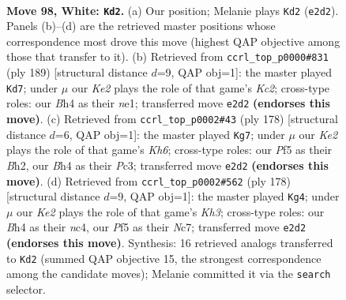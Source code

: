 \documentclass[11pt]{article}
\begin{document}
\clearpage

\begin{figure}[p]\centering
\begin{subfigure}{0.46\textwidth}\centering
\resizebox{\linewidth}{!}{%
\newchessgame
\chessboard[
  setfen={6k1/3n4/8/5P2/p6B/P6P/4K3/8 w - - 15 98},
  showmover=false,
  pgfstyle=straightmove, color=movearrow, markmove={e2-d2}
]}
\caption{}
\end{subfigure}\hfill
\begin{subfigure}{0.46\textwidth}\centering
\resizebox{\linewidth}{!}{%
\newchessgame
\chessboard[
  setfen={8/2k5/8/p7/P7/2K5/4p3/4N3 b - - 57 95},
  showmover=false,
  pgfstyle=straightmove, color=movearrow, markmove={c7-d7}
]}
\caption{}
\end{subfigure}
\\[4pt]
\begin{subfigure}{0.46\textwidth}\centering
\resizebox{\linewidth}{!}{%
\newchessgame
\chessboard[
  setfen={8/1b6/1P2k2K/8/2p5/2P5/2P4B/8 w - - 17 90},
  showmover=false,
  pgfstyle=straightmove, color=movearrow, markmove={h6-g7}
]}
\caption{}
\end{subfigure}\hfill
\begin{subfigure}{0.46\textwidth}\centering
\resizebox{\linewidth}{!}{%
\newchessgame
\chessboard[
  setfen={8/2N5/5p1k/5P2/2n1P3/7K/8/8 w - - 33 90},
  showmover=false,
  pgfstyle=straightmove, color=movearrow, markmove={h3-g4}
]}
\caption{}
\end{subfigure}
\caption{\textbf{Move 98, White: \texttt{Kd2}.} (a) Our position; Melanie plays \texttt{Kd2} (\texttt{e2d2}). Panels (b)--(d) are the retrieved master positions whose correspondence most drove this move (highest QAP objective among those that transfer to it). (b) Retrieved from \texttt{ccrl\_top\_p0000\#831} (ply 189) [structural distance $d$=9, QAP obj=1]: the master played \texttt{Kd7}; under $\mu$ our \emph{Ke2} plays the role of that game's \emph{Kc2}; cross-type roles: our \emph{B}h4 as their \emph{n}e1; transferred move \texttt{e2d2} \textbf{(endorses this move)}. (c) Retrieved from \texttt{ccrl\_top\_p0002\#43} (ply 178) [structural distance $d$=6, QAP obj=1]: the master played \texttt{Kg7}; under $\mu$ our \emph{Ke2} plays the role of that game's \emph{Kh6}; cross-type roles: our \emph{P}f5 as their \emph{B}h2, our \emph{B}h4 as their \emph{P}c3; transferred move \texttt{e2d2} \textbf{(endorses this move)}. (d) Retrieved from \texttt{ccrl\_top\_p0002\#562} (ply 178) [structural distance $d$=9, QAP obj=1]: the master played \texttt{Kg4}; under $\mu$ our \emph{Ke2} plays the role of that game's \emph{Kh3}; cross-type roles: our \emph{B}h4 as their \emph{n}c4, our \emph{P}f5 as their \emph{N}c7; transferred move \texttt{e2d2} \textbf{(endorses this move)}. Synthesis: 16 retrieved analogs transferred to \texttt{Kd2} (summed QAP objective 15, the strongest correspondence among the candidate moves); Melanie committed it via the \texttt{search} selector.}
\label{fig:thought-m194}
\end{figure}
\end{document}
